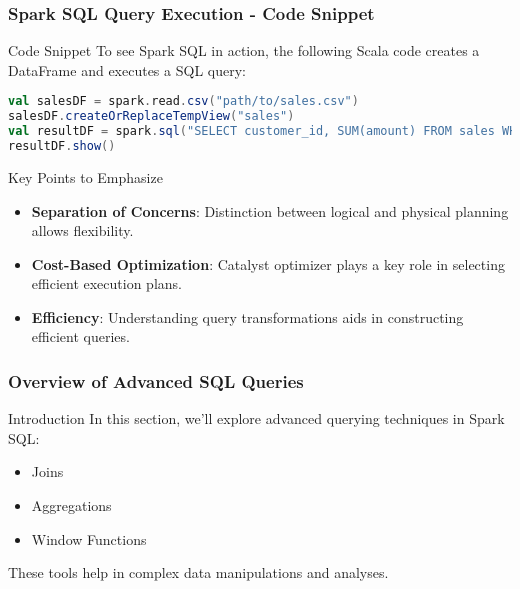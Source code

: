 \documentclass[aspectratio=169]{beamer}
\begin{document}
\begin{frame}[fragile]
    \frametitle{Spark SQL Query Execution - Code Snippet}
    \begin{block}{Code Snippet}
        To see Spark SQL in action, the following Scala code creates a DataFrame and executes a SQL query:
        \begin{lstlisting}[language=scala]
val salesDF = spark.read.csv("path/to/sales.csv")
salesDF.createOrReplaceTempView("sales")
val resultDF = spark.sql("SELECT customer_id, SUM(amount) FROM sales WHERE amount > 100 GROUP BY customer_id")
resultDF.show()
        \end{lstlisting}
    \end{block}
    
    \begin{block}{Key Points to Emphasize}
        \begin{itemize}
            \item \textbf{Separation of Concerns}: Distinction between logical and physical planning allows flexibility.
            \item \textbf{Cost-Based Optimization}: Catalyst optimizer plays a key role in selecting efficient execution plans.
            \item \textbf{Efficiency}: Understanding query transformations aids in constructing efficient queries.
        \end{itemize}
    \end{block}
\end{frame}

\begin{frame}
    \titlepage
\end{frame}

\begin{frame}
    \frametitle{Overview of Advanced SQL Queries}
    \begin{block}{Introduction}
        In this section, we'll explore advanced querying techniques in Spark SQL:
        \begin{itemize}
            \item Joins
            \item Aggregations
            \item Window Functions
        \end{itemize}
        These tools help in complex data manipulations and analyses.
    \end{block}
\end{frame}
\end{document}
